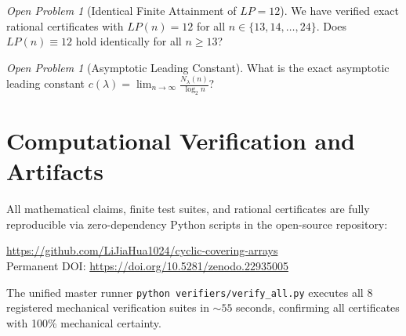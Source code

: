 \documentclass[11pt,a4paper]{article}
\theoremstyle{definition}
\theoremstyle{remark}
\newtheorem{openproblem}[theorem]{Open Problem}
\begin{document}
\begin{openproblem}[Identical Finite Attainment of $LP=12$]
We have verified exact rational certificates with $LP(n) = 12$ for all $n \in \{13, 14, \dots, 24\}$. Does $LP(n) \equiv 12$ hold identically for all $n \ge 13$?
\end{openproblem}

\begin{openproblem}[Asymptotic Leading Constant]
What is the exact asymptotic leading constant $c(\lambda) = \lim_{n \to \infty} \frac{N_\lambda(n)}{\log_2 n}$?
\end{openproblem}

\section{Computational Verification and Artifacts}
\label{sec:artifacts}

All mathematical claims, finite test suites, and rational certificates are fully reproducible via zero-dependency Python scripts in the open-source repository:
\begin{center}
    \url{https://github.com/LiJiaHua1024/cyclic-covering-arrays} \\
    Permanent DOI: \url{https://doi.org/10.5281/zenodo.22935005}
\end{center}
The unified master runner \texttt{python verifiers/verify_all.py} executes all 8 registered mechanical verification suites in $\sim 55$ seconds, confirming all certificates with 100\% mechanical certainty.
\end{document}

